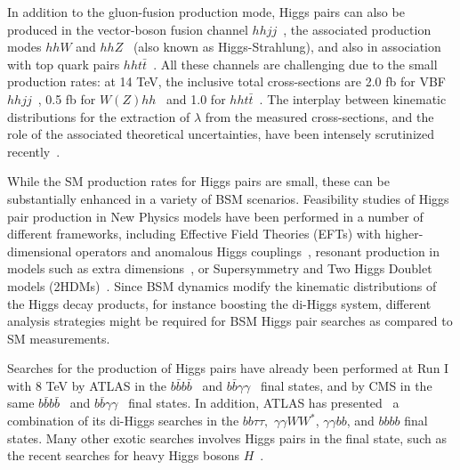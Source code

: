 In addition to the gluon-fusion production mode, Higgs pairs
can also be produced in the vector-boson fusion
channel $hhjj$~\cite{Contino:2010mh,Dolan:2013rja,Dolan:2015zja,
  Brooijmans:2014eja},
the associated production modes
$hhW$ and $hhZ$~\cite{Barger:1988jk,baglio,Cao:2015oxx}
(also known as Higgs-Strahlung),
and also in association
with top quark pairs $hht\bar{t}$~\cite{Englert:2014uqa}.
%
All these channels are challenging due to the small production
rates: at 14 TeV, the inclusive total cross-sections are
2.0 fb for VBF $hhjj$~\cite{Liu-Sheng:2014gxa},
0.5 fb for $W(Z)hh$~\cite{baglio}
and 1.0 for $hht\bar{t}$~\cite{Englert:2014uqa}.
%
The interplay between  kinematic
distributions for the
extraction of $\lambda$ from the measured
cross-sections, and the role of the associated theoretical
uncertainties, have been intensely scrutinized
recently~\cite{Slawinska:2014vpa,Chen:2014xra,Goertz:2013kp,
  Frederix:2014hta,Dawson:2015oha,Maltoni:2014eza,Maierhofer:2013sha,Grigo:2013rya,Grigo:2014jma}.
%


While the SM production rates for Higgs
pairs are small, these can be substantially
enhanced in a variety of BSM scenarios.
%
Feasibility studies of Higgs pair production in New Physics
models have been performed in a number of different frameworks,
including Effective Field
Theories (EFTs) with higher-dimensional
operators and anomalous 
Higgs couplings~\cite{Nishiwaki:2013cma,Dall'Osso:2015aia,Azatov:2015oxa,Liu:2014rba,Goertz:2014qta,He:2015spf,Grober:2015cwa}, resonant production
in models such as extra dimensions~\cite{Gouzevitch:2013qca,Cooper:2013kia,No:2013wsa,Wen-Juan:2015gqg}, or Supersymmetry and
Two Higgs Doublet models (2HDMs)~\cite{Belyaev:1999kk,Han:2013sga,Hespel:2014sla,Wu:2015nba,Cao:2014kya,Ellwanger:2013ova}.
%
Since BSM dynamics modify
the kinematic distributions of the Higgs decay products, for
instance boosting the di-Higgs system,
different analysis strategies  might be required for BSM
Higgs pair searches as compared to SM measurements.


Searches for the production of Higgs pairs
have already been performed at Run I with 8 TeV
by ATLAS in the $b\bar{b}b\bar{b}$~\cite{Aad:2015uka}
and $b\bar{b}\gamma\gamma$~\cite{Aad:2014yja} final states,
and by
CMS in the same $b\bar{b}b\bar{b}$~\cite{Khachatryan:2015yea}
and $b\bar{b}\gamma\gamma$~\cite{Chatrchyan:2011wt} final
states.
%
%
In addition, ATLAS has presented~\cite{Aad:2015xja} a combination
of its di-Higgs searches in the $bb\tau\tau,$
$\gamma\gamma WW^*$, $\gamma\gamma bb$, and $bbbb$ final states.
%
Many other exotic searches involves Higgs pairs in the final
state, such as the recent
searches for heavy Higgs bosons $H$~\cite{Khachatryan:2015tha}.



